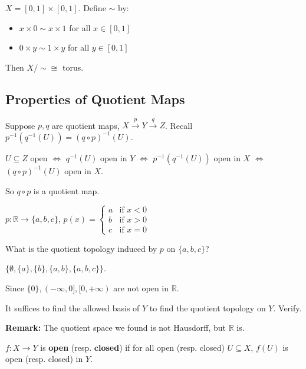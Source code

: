 \documentclass[11pt]{report}
\begin{document}
\begin{exbox}
$X = [0, 1] \times [0, 1]$. Define $\sim$ by:
\begin{itemize}
    \item $x \times 0 \sim x \times 1$ for all $x \in [0, 1]$
    \item $0 \times y \sim 1 \times y$ for all $y \in [0, 1]$
\end{itemize}
Then $X/{\sim} \cong$ torus.
\end{exbox}

\subsection{Properties of Quotient Maps}

\begin{exbox}
Suppose $p, q$ are quotient maps, $X \xrightarrow{p} Y \xrightarrow{q} Z$. Recall $p^{-1}(q^{-1}(U)) = (q \circ p)^{-1}(U)$.

$U \subseteq Z$ open $\Leftrightarrow$ $q^{-1}(U)$ open in $Y$ $\Leftrightarrow$ $p^{-1}(q^{-1}(U))$ open in $X$ $\Leftrightarrow$ $(q \circ p)^{-1}(U)$ open in $X$.

So $q \circ p$ is a quotient map.
\end{exbox}

\begin{exbox}
$p: \mathbb{R} \to \{a, b, c\}$, $p(x) = \begin{cases} a & \text{if } x < 0 \\ b & \text{if } x > 0 \\ c & \text{if } x = 0 \end{cases}$

What is the quotient topology induced by $p$ on $\{a, b, c\}$?

$\{\emptyset, \{a\}, \{b\}, \{a, b\}, \{a, b, c\}\}$.

Since $\{0\}, (-\infty, 0], [0, +\infty)$ are not open in $\mathbb{R}$.

It suffices to find the allowed basis of $Y$ to find the quotient topology on $Y$. Verify.

\textbf{Remark:} The quotient space we found is not Hausdorff, but $\mathbb{R}$ is.
\end{exbox}

\begin{defbox}
$f: X \to Y$ is \textbf{open} (resp. \textbf{closed}) if for all open (resp. closed) $U \subseteq X$, $f(U)$ is open (resp. closed) in $Y$.
\end{defbox}
\end{document}
